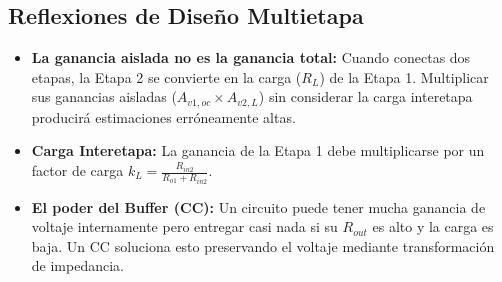 \documentclass[11pt, a4paper]{article}
\begin{document}
\subsection*{Reflexiones de Diseño Multietapa}
\begin{itemize}
    \item \textbf{La ganancia aislada no es la ganancia total:} Cuando conectas dos etapas, la Etapa 2 se convierte en la carga ($R_L$) de la Etapa 1. Multiplicar sus ganancias aisladas ($A_{v1,oc} \times A_{v2,L}$) sin considerar la carga interetapa producirá estimaciones erróneamente altas.
    \item \textbf{Carga Interetapa:} La ganancia de la Etapa 1 debe multiplicarse por un factor de carga $k_L = \frac{R_{in2}}{R_{o1} + R_{in2}}$.
    \item \textbf{El poder del Buffer (CC):} Un circuito puede tener mucha ganancia de voltaje internamente pero entregar casi nada si su $R_{out}$ es alto y la carga es baja. Un CC soluciona esto preservando el voltaje mediante transformación de impedancia.
\end{itemize}
\end{document}
